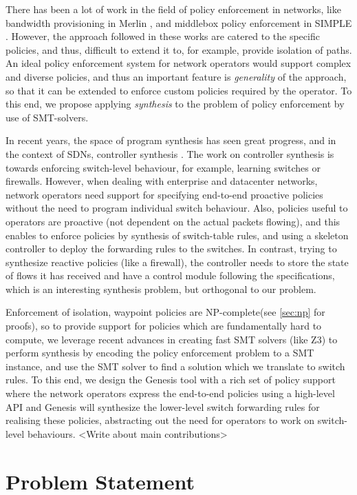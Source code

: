 \documentclass[]{sig}
\begin{document}
There has been a lot of work in the field of policy enforcement in networks, like bandwidth provisioning in Merlin \cite{Merlin}, and middlebox policy enforcement in SIMPLE \cite{simple}. However, the approach followed in these works are catered to the specific policies, and thus, difficult to extend it to, for example, provide isolation of paths. An ideal policy enforcement system for network operators would support complex and diverse policies, and thus an important feature is \emph{generality} of the approach, so that it can be extended to enforce custom policies required by the operator. To this end, we propose applying \emph{synthesis} to the problem of policy enforcement by use of SMT-solvers.

In recent years, the space of program synthesis has seen great progress, and in the context of SDNs, controller synthesis \cite{netegg}. The work on controller synthesis is towards enforcing switch-level behaviour, for example, learning switches or firewalls. However, when dealing with enterprise and datacenter networks, network operators need support for specifying end-to-end proactive policies without the need to program individual switch behaviour. Also, policies useful to operators are proactive (not dependent on the actual packets flowing), and this enables to enforce policies by synthesis of switch-table rules, and using a skeleton controller to deploy the forwarding rules to the switches. In contrast, trying to synthesize reactive policies (like a firewall), the controller needs to store the state of flows it has received and have a control module following the specifications, which is an interesting synthesis problem, but orthogonal to our problem.

 Enforcement of isolation, waypoint policies are NP-complete(see \cref{sec:np} for proofs), so to provide support for policies which are fundamentally hard to compute, we leverage recent advances in creating fast SMT solvers (like Z3) to perform synthesis by encoding the policy enforcement problem to a SMT instance, and use the SMT solver to find a solution which we translate to switch rules. To this end, we design the Genesis tool with a rich set of policy support where the network operators express the end-to-end policies using a high-level API and Genesis will synthesize the lower-level switch forwarding rules for realising these policies, abstracting out the need for operators to work on switch-level behaviours. 
<Write about main contributions> 
\section{Problem Statement}
\end{document}
